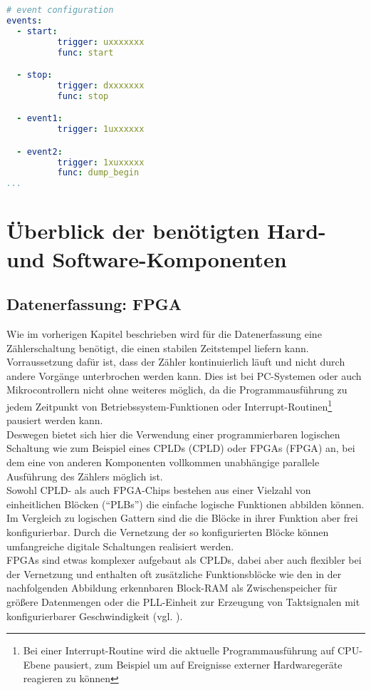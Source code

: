 \begin{lstlisting}[language=yaml]
# event configuration
events: 
  - start:
          trigger: uxxxxxxx
          func: start

  - stop:
          trigger: dxxxxxxx
          func: stop

  - event1:
          trigger: 1uxxxxxx

  - event2:
          trigger: 1xuxxxxx
          func: dump_begin
...
\end{lstlisting}

\clearpage
\section{Überblick der benötigten Hard- und Software-Komponenten}
\subsection{Datenerfassung: FPGA}
Wie im vorherigen Kapitel beschrieben wird für die Datenerfassung eine Zählerschaltung benötigt, die einen stabilen Zeitstempel liefern kann. Vorraussetzung dafür ist, dass der Zähler kontinuierlich läuft und nicht durch andere Vorgänge unterbrochen werden kann. Dies ist bei PC-Systemen oder auch Mikrocontrollern nicht ohne weiteres möglich, da die Programmausführung zu jedem Zeitpunkt von Betriebssystem-Funktionen oder Interrupt-Routinen\footnote{Bei einer Interrupt-Routine wird die aktuelle Programmausführung auf CPU-Ebene pausiert, zum Beispiel um auf Ereignisse externer Hardwaregeräte reagieren zu können} pausiert werden kann.\\
Deswegen bietet sich hier die Verwendung einer programmierbaren logischen Schaltung wie zum Beispiel eines CPLDs (\acrlong{CPLD}) oder FPGAs (\acrlong{FPGA}) an, bei dem eine von anderen Komponenten vollkommen unabhängige parallele Ausführung des Zählers möglich ist.\\
Sowohl CPLD- als auch FPGA-Chips bestehen aus einer Vielzahl von einheitlichen Blöcken (``PLBs'') die einfache logische Funktionen abbilden können. Im Vergleich zu logischen Gattern sind die die Blöcke in ihrer Funktion aber frei konfigurierbar. Durch die Vernetzung der so konfigurierten Blöcke können umfangreiche digitale Schaltungen realisiert werden.\\
FPGAs sind etwas komplexer aufgebaut als CPLDs, dabei aber auch flexibler bei der Vernetzung und enthalten oft zusätzliche Funktionsblöcke wie den in der nachfolgenden Abbildung erkennbaren Block-RAM als Zwischenspeicher für größere Datenmengen oder die \acrshort{PLL}-Einheit zur Erzeugung von Taktsignalen mit konfigurierbarer Geschwindigkeit (vgl. \cite{wiki:PLD}).

